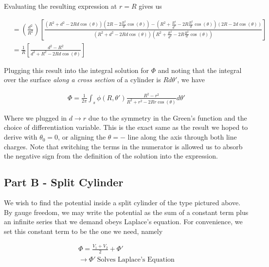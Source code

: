 \documentclass[paper=a4, fontsize=11pt]{scrartcl} %
\numberwithin{equation}{section} %
\numberwithin{figure}{section} %
\numberwithin{table}{section} %
\begin{document}
Evaluating the resulting expression at $r = R$ gives us

\begin{align}
&= \left(\frac{d^2}{R^2}\right)   \left[\frac{(R^2 + d^2 - 2 R d \cos(\theta))(2R - 2 \frac{R^2}{d}\cos(\theta)) - (R^2 + \frac{R^4}{d^2} - 2 R \frac{R^2}{d}\cos(\theta))(2R - 2d \cos(\theta))}{(R^2 + d^2 - 2 R d \cos(\theta))(R^2 + \frac{R^2}{d^2} - 2 R \frac{R^2}{d}\cos(\theta))}\right] \\
&= \frac{1}{R}\left[\frac{d^2 - R^2}{d^2 + R^2 - 2Rd\cos(\theta)}\right]
\end{align}

Plugging this result into the integral solution for $\Phi$ and noting that the integral over the surface \textit{along a cross section} of a cylinder is $R d\theta'$, we have

\begin{align}
\Phi = \frac{1}{2\pi}\int_s \phi(R, \theta')\frac{R^2 - r^2}{R^2 + r^2 - 2 R r \cos(\theta)}d\theta' 
\end{align}



Where we plugged in $d \rightarrow r$ due to the symmetry in the Green's function and the choice of differentiation variable. This is the exact same as the result we hoped to derive with $\theta_0 = 0$, or aligning the $\theta=-$ line along the axis through both line charges. Note that switching the terms in the numerator is allowed us to absorb the negative sign from the definition of the solution into the expression.

\subsection{Part B - Split Cylinder}

We wish to find the potential inside a split cylinder of the type pictured above. By gauge freedom, we may write the potential as the sum of a constant term plus an infinite series that we demand obeys Laplace's equation. For convenience, we set this constant term to be the one we need, namely

\begin{align}
\Phi = \frac{V_1 + V_2}{2} + \Phi' \\
\rightarrow \Phi' \ \text{Solves Laplace's Equation} \\
\end{align}
\end{document}
